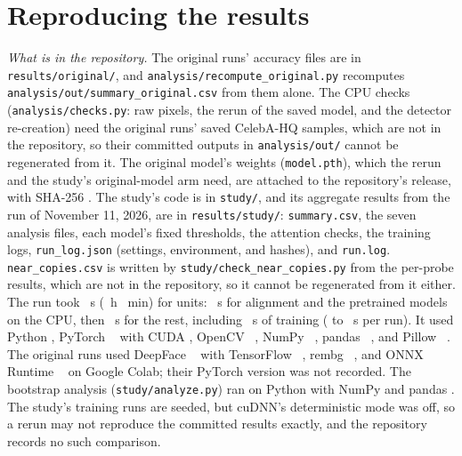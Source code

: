 \section*{Reproducing the results}

\textit{What is in the repository.} The original runs' accuracy files are in \texttt{results/\allowbreak original/}, and \texttt{analysis/\allowbreak recompute\_original.py} recomputes \texttt{analysis/\allowbreak out/\allowbreak summary\_original.csv} from them alone. The CPU checks (\texttt{analysis/\allowbreak checks.py}: raw pixels, the rerun of the saved model, and the detector re-creation) need the original runs' saved CelebA-HQ samples, which are not in the repository, so their committed outputs in \texttt{analysis/\allowbreak out/} cannot be regenerated from it. The original model's weights (\texttt{model.pth}), which the rerun and the study's original-model arm need, are attached to the repository's release, with SHA-256 \texttt{}. The study's code is in \texttt{study/}, and its aggregate results from the run of November 11, 2026, are in \texttt{results/\allowbreak study/}: \texttt{summary.csv}, the seven analysis files, each model's fixed thresholds, the attention checks, the training logs, \texttt{run\_log.json} (settings, environment, and hashes), and \texttt{run.log}. \texttt{near\_copies.csv} is written by \texttt{study/\allowbreak check\_near\_copies.py} from the per-probe results, which are not in the repository, so it cannot be regenerated from it either. The run took ~s (~h ~min) for  units: ~s for alignment and the pretrained models on the CPU, then ~s for the rest, including ~s of training ( to ~s per run). It used Python , PyTorch ~\cite{paszke2019pytorch} with CUDA , OpenCV ~\cite{bradski2000opencv}, NumPy ~\cite{harris2020numpy}, pandas ~\cite{mckinney2010pandas}, and Pillow ~\cite{pillow}. The original runs used DeepFace ~\cite{deepface} with TensorFlow ~\cite{abadi2016tensorflow}, rembg ~\cite{rembg}, and ONNX Runtime ~\cite{onnxruntime} on Google Colab; their PyTorch version was not recorded. The bootstrap analysis (\texttt{study/\allowbreak analyze.py}) ran on Python  with NumPy  and pandas . The study's training runs are seeded, but cuDNN's deterministic mode was off, so a rerun may not reproduce the committed results exactly, and the repository records no such comparison.

